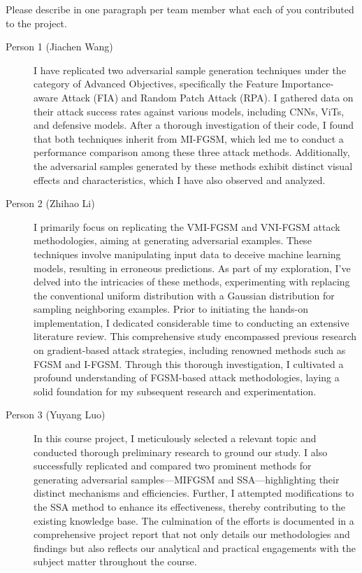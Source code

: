 Please describe in one paragraph per team member what each of you contributed to the project.
\begin{description}
\item[Person 1 (Jiachen Wang)] I have replicated two adversarial sample generation techniques under the category of Advanced Objectives, specifically the Feature Importance-aware Attack (FIA) and Random Patch Attack (RPA). I gathered data on their attack success rates against various models, including CNNs, ViTs, and defensive models. After a thorough investigation of their code, I found that both techniques inherit from MI-FGSM, which led me to conduct a performance comparison among these three attack methods. Additionally, the adversarial samples generated by these methods exhibit distinct visual effects and characteristics, which I have also observed and analyzed.
\item[Person 2 (Zhihao Li)] I primarily focus on replicating the VMI-FGSM and VNI-FGSM attack methodologies, aiming at generating adversarial examples. These techniques involve manipulating input data to deceive machine learning models, resulting in erroneous predictions. As part of my exploration, I've delved into the intricacies of these methods, experimenting with replacing the conventional uniform distribution with a Gaussian distribution for sampling neighboring examples. Prior to initiating the hands-on implementation, I dedicated considerable time to conducting an extensive literature review. This comprehensive study encompassed previous research on gradient-based attack strategies, including renowned methods such as FGSM and I-FGSM. Through this thorough investigation, I cultivated a profound understanding of FGSM-based attack methodologies, laying a solid foundation for my subsequent research and experimentation.
\item [Person 3 (Yuyang Luo)] In this course project, I meticulously selected a relevant topic and conducted thorough preliminary research to ground our study. I also successfully replicated and compared two prominent methods for generating adversarial samples—MIFGSM and SSA—highlighting their distinct mechanisms and efficiencies. Further, I attempted modifications to the SSA method to enhance its effectiveness, thereby contributing to the existing knowledge base. The culmination of the efforts is documented in a comprehensive project report that not only details our methodologies and findings but also reflects our analytical and practical engagements with the subject matter throughout the course.

\end{description}



